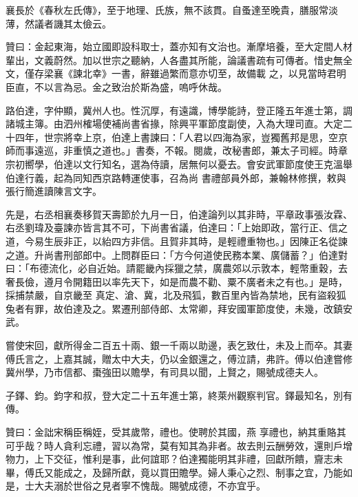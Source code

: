 \begin{pinyinscope}
 襄長於《春秋左氏傳》，至于地理、氏族，無不該貫。自蚤達至晚貴，膳服常淡薄，然議者譏其太儉云。



 贊曰：金起東海，始立國即設科取士，蓋亦知有文治也。漸摩培養，至大定間人材輩出，文義蔚然。加以世宗之聽納，人各盡其所能，論議書疏有可傳者。惜史無全文，僅存梁襄《諫北幸》一書，辭雖過繁而意亦切至，故備載
 之，以見當時君明臣直，不以言為忌。金之致治於斯為盛，嗚呼休哉。



 路伯達，字仲顯，冀州人也。性沉厚，有遠識，博學能詩，登正隆五年進士第，調諸城主簿。由泗州榷場使補尚書省掾，除興平軍節度副使，入為大理司直。大定二十四年，世宗將幸上京，伯達上書諫曰：「人君以四海為家，豈獨舊邦是思，空京師而事遠巡，非重慎之道也。」書奏，不報。閱歲，改秘書郎，兼太子司經。時章宗初嚮學，伯達以文行知名，選為侍讀，居無何以憂去。會安武軍節度使王克溫舉伯達行義，起為同知西京路轉運使事，召為尚
 書禮部員外郎，兼翰林修撰，敕與張行簡進讀陳言文字。



 先是，右丞相襄奏移賀天壽節於九月一日，伯達論列以其非時，平章政事張汝霖、右丞劉瑋及臺諫亦皆言其不可，下尚書省議，伯達曰：「上始即政，當行正、信之道，今易生辰非正，以紿四方非信。且賀非其時，是輕禮重物也。」因陳正名從諫之道。升尚書刑部郎中。上問群臣曰：「方今何道使民務本業、廣儲蓄？」伯達對曰：「布德流化，必自近始。請罷畿內採獵之禁，廣農郊以示敦本，輕幣重穀，去奢長儉，遵月令開籍田以率先天下，如是而農不勸、粟不廣者未之有也。」是時，採捕禁嚴，自京畿至
 真定、滄、冀，北及飛狐，數百里內皆為禁地，民有盜殺狐兔者有罪，故伯達及之。累遷刑部侍郎、太常卿，拜安國軍節度使，未幾，改鎮安武。



 嘗使宋回，獻所得金二百五十兩、銀一千兩以助邊，表乞致仕，未及上而卒。其妻傅氏言之，上嘉其誠，贈太中大夫，仍以金銀還之，傅泣請，弗許。傅以伯達嘗修冀州學，乃市信都、棗強田以贍學，有司具以聞，上賢之，賜號成德夫人。



 子鐸、鈞。鈞字和叔，登大定二十五年進士第，終萊州觀察判官。鐸最知名，別有傳。



 贊曰：金詘宋稱臣稱姪，受其歲幣，禮也。使聘於其國，燕
 享禮也，納其重賂其可乎哉？時人貪利忘禮，習以為常，莫有知其為非者。故去則云酬勞效，還則戶增物力，上下交征，惟利是事，此何誼耶？伯達獨能明其非禮，回獻所饋，齎志未畢，傅氏又能成之，及歸所獻，竟以買田贍學。婦人秉心之烈、制事之宜，乃能如是，士大夫溺於世俗之見者寧不愧哉。賜號成德，不亦宜乎。



\end{pinyinscope}